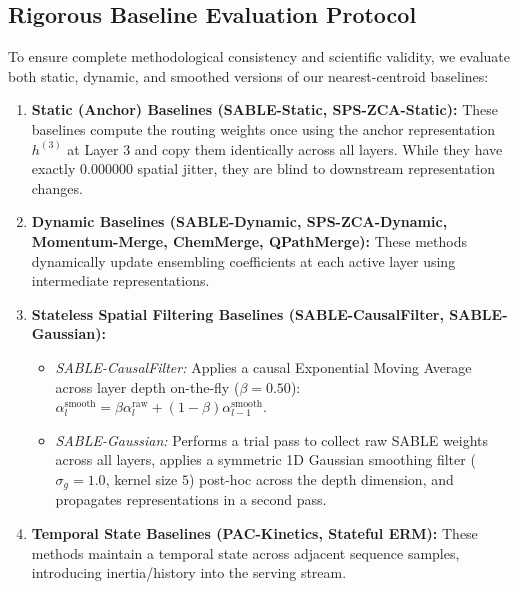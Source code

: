 \subsection{Rigorous Baseline Evaluation Protocol}
To ensure complete methodological consistency and scientific validity, we evaluate both static, dynamic, and smoothed versions of our nearest-centroid baselines:
\begin{enumerate}
    \item \textbf{Static (Anchor) Baselines (SABLE-Static, SPS-ZCA-Static):} These baselines compute the routing weights once using the anchor representation $h^{(3)}$ at Layer 3 and copy them identically across all layers. While they have exactly $0.000000$ spatial jitter, they are blind to downstream representation changes.
    \item \textbf{Dynamic Baselines (SABLE-Dynamic, SPS-ZCA-Dynamic, Momentum-Merge, ChemMerge, QPathMerge):} These methods dynamically update ensembling coefficients at each active layer using intermediate representations.
    \item \textbf{Stateless Spatial Filtering Baselines (SABLE-CausalFilter, SABLE-Gaussian):} 
    \begin{itemize}
        \item \emph{SABLE-CausalFilter:} Applies a causal Exponential Moving Average across layer depth on-the-fly ($\beta=0.50$): $\alpha^{\text{smooth}}_l = \beta \alpha^{\text{raw}}_l + (1-\beta) \alpha^{\text{smooth}}_{l-1}$.
        \item \emph{SABLE-Gaussian:} Performs a trial pass to collect raw SABLE weights across all layers, applies a symmetric 1D Gaussian smoothing filter ($\sigma_g = 1.0$, kernel size $5$) post-hoc across the depth dimension, and propagates representations in a second pass.
    \end{itemize}
    \item \textbf{Temporal State Baselines (PAC-Kinetics, Stateful ERM):} These methods maintain a temporal state across adjacent sequence samples, introducing inertia/history into the serving stream.
\end{enumerate}

